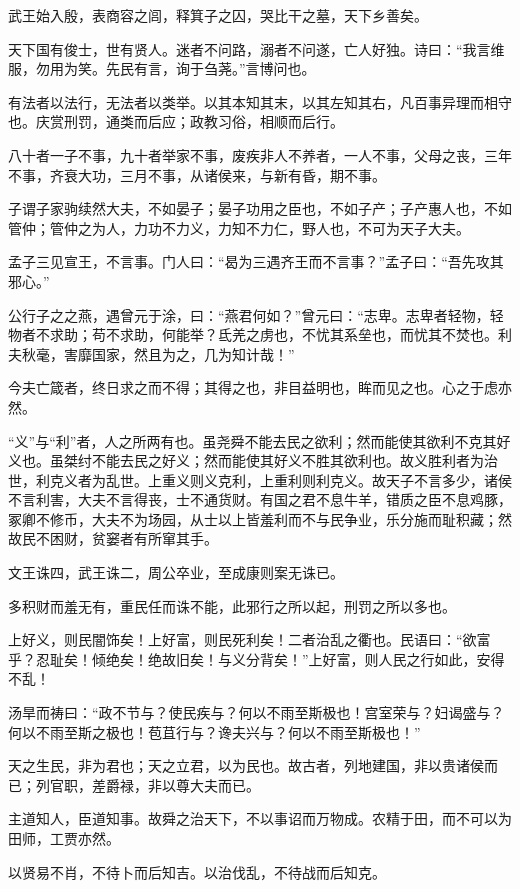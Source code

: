 \documentclass[]{article}
\begin{document}
武王始入殷，表商容之闾，释箕子之囚，哭比干之墓，天下乡善矣。

天下国有俊士，世有贤人。迷者不问路，溺者不问遂，亡人好独。诗曰：``我言维服，勿用为笑。先民有言，询于刍荛。''言博问也。

有法者以法行，无法者以类举。以其本知其末，以其左知其右，凡百事异理而相守也。庆赏刑罚，通类而后应；政教习俗，相顺而后行。

八十者一子不事，九十者举家不事，废疾非人不养者，一人不事，父母之丧，三年不事，齐衰大功，三月不事，从诸侯来，与新有昏，期不事。

子谓子家驹续然大夫，不如晏子；晏子功用之臣也，不如子产；子产惠人也，不如管仲；管仲之为人，力功不力义，力知不力仁，野人也，不可为天子大夫。

孟子三见宣王，不言事。门人曰：``曷为三遇齐王而不言事？''孟子曰：``吾先攻其邪心。''

公行子之之燕，遇曾元于涂，曰：``燕君何如？''曾元曰：``志卑。志卑者轻物，轻物者不求助；苟不求助，何能举？氐羌之虏也，不忧其系垒也，而忧其不焚也。利夫秋毫，害靡国家，然且为之，几为知计哉！''

今夫亡箴者，终日求之而不得；其得之也，非目益明也，眸而见之也。心之于虑亦然。

``义''与``利''者，人之所两有也。虽尧舜不能去民之欲利；然而能使其欲利不克其好义也。虽桀纣不能去民之好义；然而能使其好义不胜其欲利也。故义胜利者为治世，利克义者为乱世。上重义则义克利，上重利则利克义。故天子不言多少，诸侯不言利害，大夫不言得丧，士不通货财。有国之君不息牛羊，错质之臣不息鸡豚，冢卿不修币，大夫不为场园，从士以上皆羞利而不与民争业，乐分施而耻积藏；然故民不困财，贫窭者有所窜其手。

文王诛四，武王诛二，周公卒业，至成康则案无诛已。

多积财而羞无有，重民任而诛不能，此邪行之所以起，刑罚之所以多也。

上好义，则民闇饰矣！上好富，则民死利矣！二者治乱之衢也。民语曰：``欲富乎？忍耻矣！倾绝矣！绝故旧矣！与义分背矣！''上好富，则人民之行如此，安得不乱！

汤旱而祷曰：``政不节与？使民疾与？何以不雨至斯极也！宫室荣与？妇谒盛与？何以不雨至斯之极也！苞苴行与？谗夫兴与？何以不雨至斯极也！''

天之生民，非为君也；天之立君，以为民也。故古者，列地建国，非以贵诸侯而已；列官职，差爵禄，非以尊大夫而已。

主道知人，臣道知事。故舜之治天下，不以事诏而万物成。农精于田，而不可以为田师，工贾亦然。

以贤易不肖，不待卜而后知吉。以治伐乱，不待战而后知克。
\end{document}
